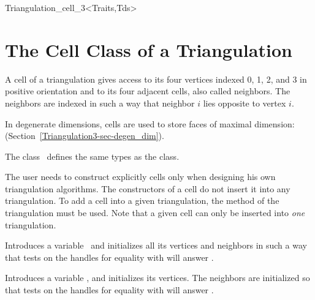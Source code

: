 \begin{ccClassTemplate}{Triangulation_cell_3<Traits,Tds>}
\section{The Cell Class of a Triangulation\\ \protect
{} }
\label{Triangulation3-sec-class-Cell}


\ccDefinition

A cell of a triangulation gives access to its four vertices indexed 0,
1, 2, and 3 in positive orientation and to its four adjacent cells, also
called neighbors. The neighbors are indexed in such a way that neighbor
$i$ lies opposite to vertex $i$.

In degenerate dimensions, cells are used to store faces of maximal
dimension: (Section~\ref{Triangulation3-sec-degen_dim}).



\ccTypes
The class \ccClassTemplateName\ defines the same types as the
 class.

\begin{ccAdvanced}
\ccCreation
The user needs to construct explicitly cells only when designing his
own triangulation algorithms. The constructors of a cell do not insert
it into any triangulation. To add a cell into a given triangulation,
the  method of the triangulation must be used. Note
that a given cell can only be inserted into \textit{one} triangulation.

{Introduces a variable \ccVar\ and initializes all its vertices and
neighbors in such a way that tests on the handles for equality with
 will answer .} 


{Introduces a variable \ccVar, and initializes its vertices. The 
neighbors are initialized so that tests on the handles for equality with
 will answer .} 


\end{ccAdvanced}
\end{ccClassTemplate}
